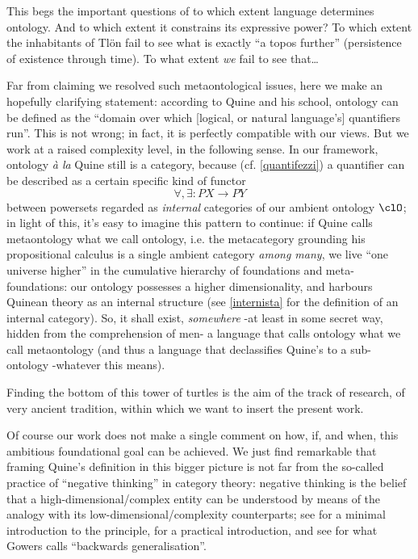 This begs the important questions of to which extent language determines ontology. And to which extent it constrains its expressive power? To which extent the inhabitants of Tl\"on fail to see what is exactly ``a topos further'' (persistence of existence through time). To what extent \emph{we} fail to see that\dots

Far from claiming we resolved such metaontological issues, here we make an hopefully clarifying statement: according to Quine and his school, ontology can be defined as the ``domain over which [logical, or natural language's] quantifiers run''. This is not wrong; in fact, it is perfectly compatible with our views. But we work at a raised complexity level, in the following sense. In our framework, ontology \emph{à la} Quine still is a category, because (cf. \autoref{quantifezzi}) a quantifier can be described as a certain specific kind of functor
\[\forall,\exists : PX \to PY\]
between powersets regarded as \emph{internal} categories of our ambient ontology $\clO$; in light of this, it's easy to imagine this pattern to continue: if Quine calls metaontology what we call ontology, i.e. the metacategory grounding his propositional calculus is a single ambient category \emph{among many}, we live ``one universe higher'' in the cumulative hierarchy of foundations and meta-foundations: our ontology possesses a higher dimensionality, and harbours Quinean theory as an internal structure (see \autoref{internista} for the definition of an internal category). So, it shall exist, \emph{somewhere} -at least in some secret way, hidden from the comprehension of men- a language that calls ontology what we call metaontology (and thus a language that declassifies Quine's to a sub-ontology -whatever this means).

Finding the bottom of this tower of turtles is the aim of the track of research, of very ancient tradition, within which we want to insert the present work.

Of course our work does not make a single comment on how, if, and when, this ambitious foundational goal can be achieved. We just find remarkable that framing Quine's definition in this bigger picture is not far from the so-called practice of ``negative thinking'' in category theory: negative thinking is the belief that a high-dimensional/complex entity can be understood by means of the analogy with its low-dimensional/complexity counterparts; see \cite{nlab:category-order,nlab:neg-think} for a minimal introduction to the principle, \cite{baez2010lectures} for a practical introduction, and see \cite{gowers2007} for what Gowers calls ``backwards generalisation''.
